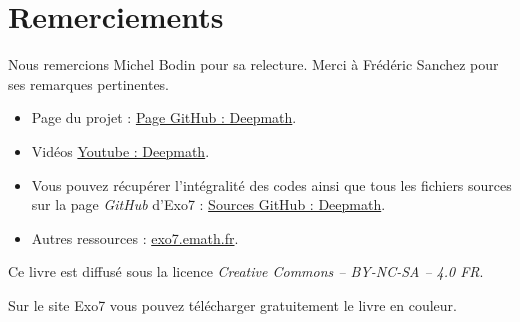 
\clearemptydoublepage
\pagestyle{empty}\thispagestyle{empty}

\vspace*{\fill}

\section*{Remerciements}


Nous remercions Michel Bodin pour sa relecture.
Merci à Frédéric Sanchez pour ses remarques pertinentes.

\bigskip

\begin{itemize}

  \item Page du projet : \href{https://exo7math.github.io/deepmath-exo7/}{\og{}Page GitHub : Deepmath\fg{}}.

  \item Vidéos \href{https://www.youtube.com/channel/UCnKarYaG1VuzdWix1vBitFg/}{\og{}Youtube : Deepmath\fg{}}.

  \item Vous pouvez récupérer l'intégralité des codes \Python{} ainsi que tous les fichiers sources sur la page \emph{GitHub} d'Exo7 :
\href{https://github.com/exo7math/deepmath-exo7}{\og{}Sources GitHub : Deepmath\fg{}}.
  
  \item Autres ressources : \href{http://exo7.emath.fr/}{exo7.emath.fr}.
\end{itemize}




\vspace*{\fill}

\bigskip 

\begin{center}
\end{center}



\begin{center}
Ce livre est diffusé sous la licence \emph{Creative Commons -- BY-NC-SA -- 4.0 FR}.

Sur le site Exo7 vous pouvez télécharger gratuitement le livre en couleur.
\end{center}




\printindex
{}

